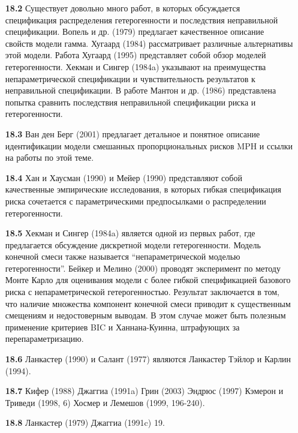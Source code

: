 \noindent

\begin{itemize}
    \item[\textbf{18.2}]
Существует довольно много работ, в которых обсуждается спецификация распределения гетерогенности и последствия неправильной спецификации. Вопель и др. (1979) предлагает качественное описание свойств модели гамма. Хугаард (1984) рассматривает различные альтернативы этой модели. Работа Хугаард (1995) представляет собой обзор моделей гетерогенности. Хекман и Сингер (1984a) указывают на преимущества непараметрической спецификации и чувствительность результатов к неправильной спецификации. В работе Мантон и др. (1986) представлена попытка сравнить последствия неправильной спецификации риска и гетерогенности.

    \item[\textbf{18.3}]
Ван ден Берг (2001) предлагает детальное и понятное описание идентификации модели смешанных пропорциональных рисков MPH и ссылки на работы по этой теме.

    \item[\textbf{18.4}]
Хан и Хаусман (1990) и Мейер (1990) представляют собой качественные эмпирические исследования, в которых гибкая спецификация риска сочетается с параметрическими предпосылками о распределении гетерогенности.

    \item[\textbf{18.5}]
Хекман и Сингер (1984a) является одной из первых работ, где предлагается обсуждение дискретной модели гетерогенности. Модель конечной смеси также называется ``непараметрической моделью гетерогенности''. Бейкер и Мелино (2000) проводят эксперимент по методу Монте Карло для оценивания модели с более гибкой спецификацией базового риска с непараметрической гетерогенностью. Результат заключается в том, что наличие множества компонент конечной смеси приводит к существенным смещениям и недостоверным выводам. В этом случае может быть полезным применение критериев BIC и Ханнана-Куинна, штрафующих за перепараметризацию.

    \item[\textbf{18.6}]
Ланкастер (1990) и Салант (1977) являются
Ланкастер
Тэйлор и Карлин (1994).
    \item[\textbf{18.7}]
Кифер (1988)
Джаггиа (1991a)
Грин (2003)
Эндрюс (1997)
Кэмерон и Триведи (1998, 6)
Хосмер и Лемешов (1999, 196-240).
    \item[\textbf{18.8}]
Ланкастер (1979)
Джаггиа (1991c)
19.
\end{itemize}




